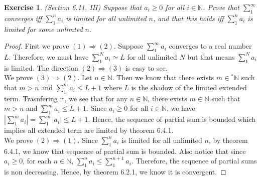 \documentclass[a4paper, 11pt]{book}
\theoremstyle{plain}
\newtheorem{exercise}{Exercise}[chapter]
\theoremstyle{plain}
\newcommand{\N}{\mathbb{N}}
\newcommand{\hyp}{{}^*}
\begin{document}
  \begin{exercise}
    (Section 6.11, III)
      Suppose that $a_i \geq 0$ for all $i \in \N$. Prove that $\sum_{1}^\infty$ converges iff $\sum_{1}^n a_i$ is limited for all unlimited $n$, and that this holds iff $\sum_{1}^n a_i$ is limited for some unlimted $n$.
  \end{exercise}
  \begin{proof}
      First we prove $(1) \Rightarrow (2)$. Suppose $\sum_{1}^\infty a_i$ converges to a real number $L$. Therefore, we must have $\sum_{1}^N a_i \simeq L$ for all unlimited $N$ but that means $\sum_{1}^N a_i$ is limited. The direction $(2) \Rightarrow (3)$ is easy to see. \\

      We prove $(3) \Rightarrow (2)$. Let $n \in \N$. Then we know that there exists $m \in \hyp \N$ such that $m>n$ and $\sum_{1}^m a_i \leq L+1$ where $L$ is the shadow of the limited extended term. Trasnfering it, we see that for any $n \in \N$, there exists $m \in \N$ such that $m>n$ and $\sum_{1}^m a_i \leq L+1$. Since $a_i \geq 0$ for all $i \in \N$, we have $\left| \sum_{1}^m a_i \right|=\sum_{1}^m |a_i| \leq L+1$. Hence, the sequence of partial sum is bounded which implies all extended term are limited by theorem 6.4.1. \\

      We prove $(2) \Rightarrow (1)$. Since $\sum_{1}^n a_i$ is limited for all unlimited $n$, by theorem 6.4.1, we know that sequence of partial sum is bounded. Also notice that since $a_i \geq 0$, for each $n \in \N$, $\sum_{1}^n a_i \leq \sum_{1}^{n+1} a_i$. Therefore, the sequence of partial sums is non decreasing. Hence, by theorem 6.2.1, we know it is convergent. 
  \end{proof}
\end{document}
